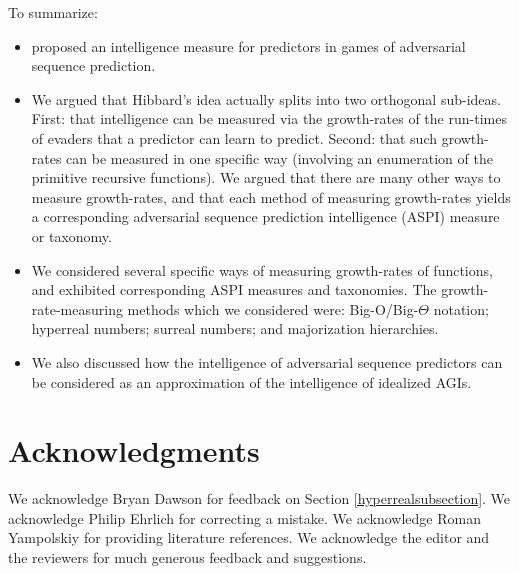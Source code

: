 \documentclass[twoside,11pt]{article}
\begin{document}
To summarize:
\begin{itemize}
    \item
    \citet{hibbard} proposed an intelligence measure for predictors
    in games of adversarial sequence prediction.
    \item
    We argued that Hibbard's idea actually splits into two orthogonal sub-ideas.
    First: that intelligence can be measured via the growth-rates of the run-times
    of evaders that a predictor can learn to predict. Second: that such growth-rates can
    be measured in one specific way (involving an enumeration of the primitive recursive
    functions). We argued that there are many other ways to measure growth-rates,
    and that each method of measuring growth-rates yields a corresponding
    adversarial sequence prediction intelligence (ASPI) measure or taxonomy.
    \item
    We considered several specific ways of measuring growth-rates of functions, and exhibited
    corresponding ASPI measures and taxonomies. The growth-rate-measuring methods
    which we considered were: Big-O/Big-$\Theta$ notation; hyperreal numbers;
    surreal numbers; and majorization hierarchies.
    \item
    We also discussed how the intelligence of adversarial sequence predictors
    can be considered as an approximation of the intelligence of idealized AGIs.
\end{itemize}

\section*{Acknowledgments}

We acknowledge Bryan Dawson for feedback on Section \ref{hyperrealsubsection}.
We acknowledge Philip Ehrlich for correcting a mistake.
We acknowledge Roman Yampolskiy for providing literature references.
We acknowledge the editor and the reviewers for much generous feedback and suggestions.

%

\end{document}
